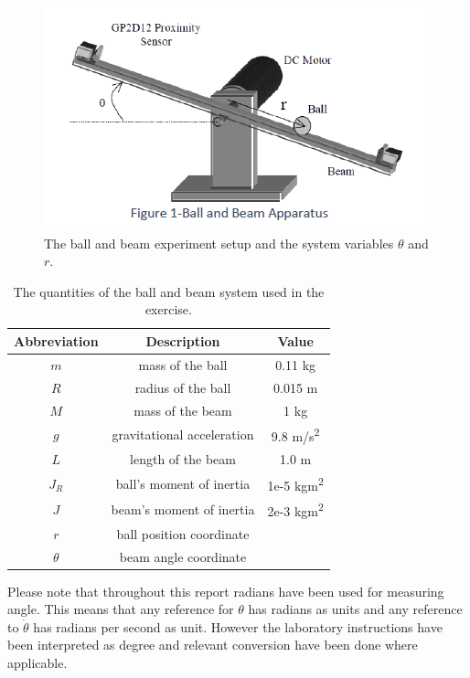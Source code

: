 \documentclass[a4paper, titlepage]{article}
\begin{document}
\begin{figure}[h!]
\center
\includegraphics[scale=0.8]{../figures/ballAndBeam.png}
\caption{The ball and beam experiment setup and the system variables $\theta$ and $r$.}
\label{fig:ballAndBeam}
\end{figure}

\begin{table}[h!]
\centering
 \begin{tabular}{||c c c||} 
 \hline
 Abbreviation & Description & Value \\ [0.5ex] 
 \hline\hline
 $m$ & mass of the ball & 0.11 kg \\ 
 $R$ & radius of the ball & 0.015 m \\
 $M$ & mass of the beam & 1 kg \\
 $g$ & gravitational acceleration & 9.8 m/s\textsuperscript{2} \\
 $L$ & length of the beam & 1.0 m \\
 $J_R$ & ball's moment of inertia & 1e-5 kgm\textsuperscript{2} \\
 $J$ & beam's moment of inertia & 2e-3 kgm\textsuperscript{2} \\
 $r$ & ball position coordinate & \\
 $\theta$ & beam angle coordinate &  \\ [1ex] 
 \hline
 \end{tabular}
 \caption{The quantities of the ball and beam system used in the exercise.}
 \label{tab:quantities}
\end{table}

Please note that throughout this report radians have been used for measuring angle.
This means that any reference for $\theta$ has radians as units and any reference to $\dot{\theta}$ has radians per second as unit.
However the laboratory instructions have been interpreted as degree and relevant conversion have been done where applicable. 
\end{document}
